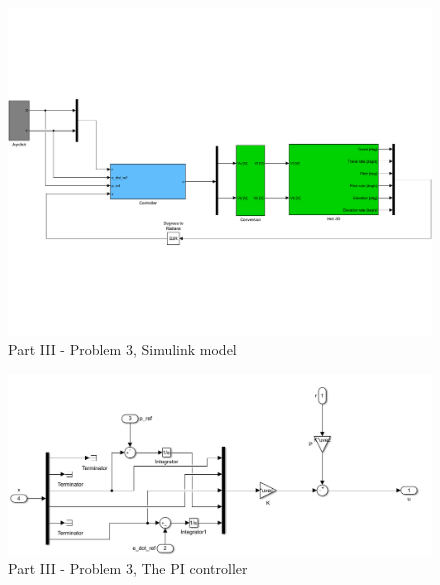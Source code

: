 \begin{figure}[htb]
	\centering
		\includegraphics[width=\textwidth]{models/P3p3.pdf}
	\caption{Part III - Problem 3, Simulink model}
\label{fig:P3p3}
\end{figure}

\begin{figure}[htb]
	\centering
		\includegraphics[width=\textwidth]{models/P3p3_PI_controller.PNG}
	\caption{Part III - Problem 3, The PI controller}
\label{fig:P3p3_PI}
\end{figure}

